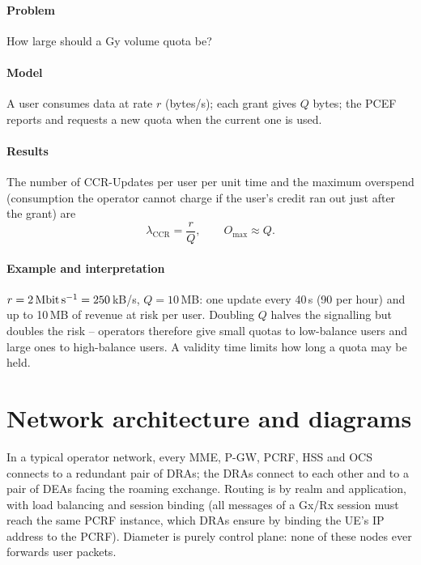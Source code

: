 \documentclass[11pt,a4paper]{article}
\begin{document}
\paragraph{Problem} How large should a Gy volume quota be?
\paragraph{Model} A user consumes data at rate $r$ (bytes/s); each grant gives $Q$ bytes; the PCEF reports
and requests a new quota when the current one is used.
\paragraph{Results} The number of CCR-Updates per user per unit time and the maximum overspend (consumption
the operator cannot charge if the user's credit ran out just after the grant) are
\begin{equation}\label{eq:quota}
  \lambda_{\mathrm{CCR}} = \frac{r}{Q}, \qquad O_{\max} \approx Q .
\end{equation}
\paragraph{Example and interpretation} $r = \qty{2}{\mega\bit\per\second} = 250$\,kB/s, $Q = 10$\,MB: one update
every 40\,s (90 per hour) and up to 10\,MB of revenue at risk per user. Doubling $Q$ halves the signalling
but doubles the risk -- operators therefore give small quotas to low-balance users and large ones to
high-balance users. A validity time limits how long a quota may be held.

\section{Network architecture and diagrams}
In a typical operator network, every MME, P-GW, PCRF, HSS and OCS connects to a redundant pair of DRAs;
the DRAs connect to each other and to a pair of DEAs facing the roaming exchange. Routing is by
realm and application, with load balancing and session binding (all messages of a Gx/Rx session must
reach the same PCRF instance, which DRAs ensure by binding the UE's IP address to the PCRF). Diameter is
purely control plane: none of these nodes ever forwards user packets.

\begin{acnfigure}
  \caption{Diameter peer lifecycle: transport set-up, capabilities exchange, watchdog, disconnection.}
  \label{fig:peer}
\end{acnfigure}
\end{document}

